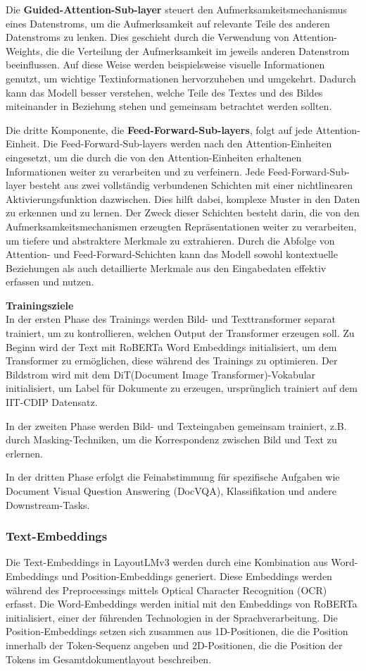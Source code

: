 \documentclass[12pt,a4paper,twoside]{article}
\begin{document}
Die \textbf{Guided-Attention-Sub-layer} steuert den Aufmerksamkeitsmechanismus eines Datenstroms, um die Aufmerksamkeit auf relevante Teile des anderen Datenstroms zu lenken. Dies geschieht durch die Verwendung von Attention-Weights, die die Verteilung der Aufmerksamkeit im jeweils anderen Datenstrom beeinflussen. Auf diese Weise werden beispielsweise visuelle Informationen genutzt, um wichtige Textinformationen hervorzuheben und umgekehrt. Dadurch kann das Modell besser verstehen, welche Teile des Textes und des Bildes miteinander in Beziehung stehen und gemeinsam betrachtet werden sollten.

Die dritte Komponente, die \textbf{Feed-Forward-Sub-layers}, folgt auf jede Attention-Einheit. Die Feed-Forward-Sub-layers werden nach den Attention-Einheiten eingesetzt, um die durch die von den Attention-Einheiten erhaltenen Informationen weiter zu verarbeiten und zu verfeinern. Jede Feed-Forward-Sub-layer besteht aus zwei vollständig verbundenen Schichten mit einer nichtlinearen Aktivierungsfunktion dazwischen. Dies hilft dabei, komplexe Muster in den Daten zu erkennen und zu lernen. Der Zweck dieser Schichten besteht darin, die von den Aufmerksamkeitsmechanismen erzeugten Repräsentationen weiter zu verarbeiten, um tiefere und abstraktere Merkmale zu extrahieren. Durch die Abfolge von Attention- und Feed-Forward-Schichten kann das Modell sowohl kontextuelle Beziehungen als auch detaillierte Merkmale aus den Eingabedaten effektiv erfassen und nutzen.
    

\textbf{Trainingsziele}\\
In der ersten Phase des Trainings werden Bild- und Texttransformer separat trainiert, um zu kontrollieren, welchen Output der Transformer erzeugen soll. Zu Beginn wird der Text mit RoBERTa Word Embeddings initialisiert, um dem Transformer zu ermöglichen, diese während des Trainings zu optimieren. 
Der Bildstrom wird mit dem DiT(Document Image Transformer)-Vokabular initialisiert, um Label für Dokumente zu erzeugen, ursprünglich trainiert auf dem IIT-CDIP Datensatz.
    
In der zweiten Phase werden Bild- und Texteingaben gemeinsam trainiert, z.B. durch Masking-Techniken, um die Korrespondenz zwischen Bild und Text zu erlernen.
    
In der dritten Phase erfolgt die Feinabstimmung für spezifische Aufgaben wie Document Visual Question Answering (DocVQA), Klassifikation und andere Downstream-Tasks.


\subsubsection{Text-Embeddings}
Die Text-Embeddings in LayoutLMv3 werden durch eine Kombination aus Word-Embeddings und Position-Embeddings generiert. Diese Embeddings werden während des Preprocessings mittels Optical Character Recognition (OCR) erfasst. Die Word-Embeddings werden initial mit den Embeddings von RoBERTa initialisiert, einer der führenden Technologien in der Sprachverarbeitung. Die Position-Embeddings setzen sich zusammen aus 1D-Positionen, die die Position innerhalb der Token-Sequenz angeben und  2D-Positionen, die die Position der Tokens im Gesamtdokumentlayout beschreiben.
\end{document}
